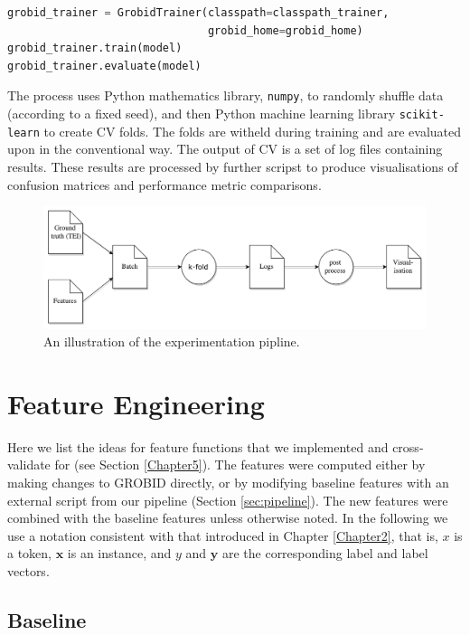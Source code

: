 \begin{lstlisting}[language=python, caption=Excerpt from our Python wrapper for GROBID, label={lst:grobid}]
grobid_trainer = GrobidTrainer(classpath=classpath_trainer,
                               grobid_home=grobid_home)
grobid_trainer.train(model)
grobid_trainer.evaluate(model)
\end{lstlisting}

The process uses Python mathematics library, \texttt{numpy}, to randomly shuffle data (according to a fixed seed), and then Python machine learning library \texttt{scikit-learn} to create CV folds. The folds are witheld during training and are evaluated upon in the conventional way. The output of CV is a set of log files containing results. These results are processed by further scripst to produce visualisations of confusion matrices and performance metric comparisons.

\begin{figure}[!ht]
\center
\includegraphics[width=\textwidth]{Figures/pipeline.pdf}
\caption{An illustration of the experimentation pipline.}
\label{fig:pipeline}
\end{figure}

\section{Feature Engineering}
\label{sec:featurengineering}

Here we list the ideas for feature functions that we implemented and cross-validate for (see Section \ref{Chapter5}). The features were computed either by making changes to GROBID directly, or by modifying baseline features with an external script from our pipeline (Section \ref{sec:pipeline}). The new features were combined with the baseline features unless otherwise noted. In the following we use a notation consistent with that introduced in Chapter \ref{Chapter2}, that is, $x$ is a token, $\mathbf{x}$ is an instance, and $y$ and $\textbf{y}$ are the corresponding label and label vectors.

\subsection{Baseline}

